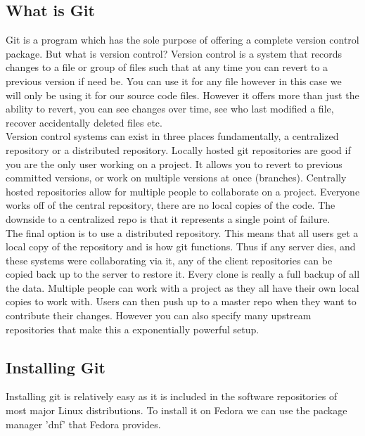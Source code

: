 \documentclass[a4paper,11pt]{report}
\begin{document}
\begin{description}
						\subsection{What is Git}
							Git is a program which has the sole purpose of offering a complete version control package. But what is version control? Version control is a system that records changes to a file or group of files such that at any time you can revert to a previous version if need be.
							You can use it for any file however in this case we will only be using it for our source code files. However it offers more than just the ability to revert, you can see changes over time, see who last modified a file, recover accidentally deleted files etc.\\

							Version control systems can exist in three places fundamentally, a centralized repository or a distributed repository.
							Locally hosted git repositories are good if you are the only user working on a project. It allows you to revert to previous committed versions, or work on multiple versions at once (branches).
							Centrally hosted repositories allow for multiple people to collaborate on a project. Everyone works off of the central repository, there are no local copies of the code.
							The downside to a centralized repo is that it represents a single point of failure.\\

							The final option is to use a distributed repository. This means that all users get a local copy of the repository and is how git functions.
							Thus if any server dies, and these systems were collaborating via it, any of the client repositories can be copied back up to the server to restore it. Every clone is really a full backup of all the data.
							Multiple people can work with a project as they all have their own local copies to work with. Users can then push up to a master repo when they want to contribute their changes.
							However you can also specify many upstream repositories that make this a exponentially powerful setup.

							\subsection{Installing Git}
								Installing git is relatively easy as it is included in the software repositories of most major Linux distributions. To install it on Fedora we can use the package manager 'dnf' that Fedora provides.


\end{description}
\end{document}
